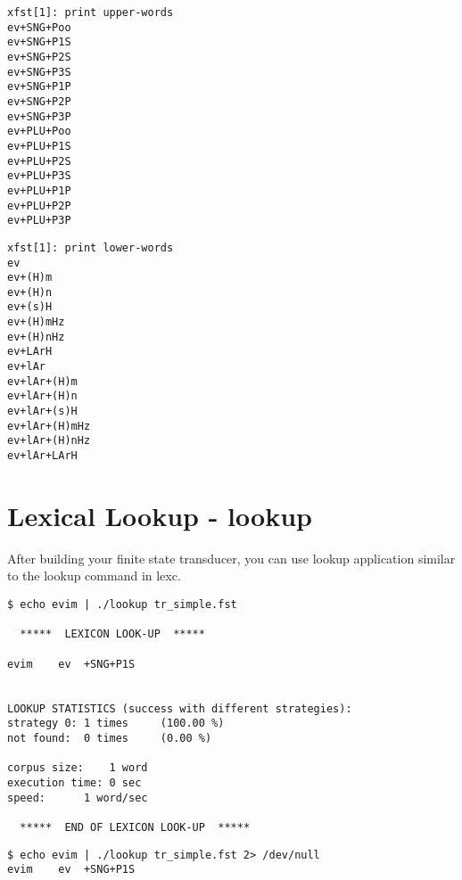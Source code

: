 \documentclass[11pt,a4paper]{article}
\begin{document}
\begin{lstlisting}[caption={Print lexical / upper strings (to be used with lookdown in lexc)}, belowskip=1em,frame=single]
xfst[1]: print upper-words
ev+SNG+Poo
ev+SNG+P1S
ev+SNG+P2S
ev+SNG+P3S
ev+SNG+P1P
ev+SNG+P2P
ev+SNG+P3P
ev+PLU+Poo
ev+PLU+P1S
ev+PLU+P2S
ev+PLU+P3S
ev+PLU+P1P
ev+PLU+P2P
ev+PLU+P3P
\end{lstlisting}

\begin{lstlisting}[caption={Print surface / lower strings (to be used with lookup in lexc)}, belowskip=1em,frame=single]
xfst[1]: print lower-words
ev
ev+(H)m
ev+(H)n
ev+(s)H
ev+(H)mHz
ev+(H)nHz
ev+LArH
ev+lAr
ev+lAr+(H)m
ev+lAr+(H)n
ev+lAr+(s)H
ev+lAr+(H)mHz
ev+lAr+(H)nHz
ev+lAr+LArH
\end{lstlisting}


\newpage

\section{Lexical Lookup - lookup}
After building your finite state transducer, you can use lookup application similar to the lookup command in lexc. \\

\begin{lstlisting}[belowskip=1em,frame=single]
$ echo evim | ./lookup tr_simple.fst

  *****  LEXICON LOOK-UP  *****

evim	ev	+SNG+P1S


LOOKUP STATISTICS (success with different strategies):
strategy 0:	1 times 	(100.00 %)
not found:	0 times 	(0.00 %)

corpus size:	1 word
execution time:	0 sec
speed:		1 word/sec

  *****  END OF LEXICON LOOK-UP  *****
\end{lstlisting}

\begin{lstlisting}[belowskip=1em,frame=single]
$ echo evim | ./lookup tr_simple.fst 2> /dev/null 
evim	ev	+SNG+P1S

\end{lstlisting}
\end{document}
